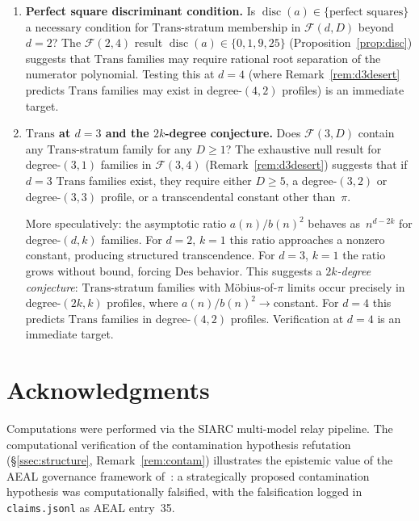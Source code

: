 \documentclass[12pt, reqno]{amsart}
\theoremstyle{definition}
\theoremstyle{remark}
\newcommand{\Trans}{\mathrm{Trans}}
\newcommand{\Des}{\mathrm{Des}}
\DeclareMathOperator{\disc}{disc}
\begin{document}
\begin{enumerate}[\bfseries(P1)]
\item \textbf{Perfect square discriminant condition.}
Is $\disc(a) \in \{\text{perfect squares}\}$
a necessary condition for $\Trans$-stratum membership in $\mathcal{F}(d,D)$ beyond $d=2$?
The $\mathcal{F}(2,4)$ result $\disc(a) \in \{0, 1, 9, 25\}$ (Proposition~\ref{prop:disc}) suggests that
$\Trans$ families may require rational root separation of the numerator polynomial.
Testing this at $d=4$ (where Remark~\ref{rem:d3desert} predicts $\Trans$ families may exist in
degree-$(4,2)$ profiles) is an immediate target.

\item \textbf{$\Trans$ at $d=3$ and the $2k$-degree conjecture.}
Does $\mathcal{F}(3,D)$ contain any $\Trans$-stratum family for any
$D \ge 1$? The exhaustive null result for degree-$(3,1)$
families in $\mathcal{F}(3,4)$ (Remark~\ref{rem:d3desert}) suggests that if $d=3$
$\Trans$ families exist, they require either $D \ge 5$,
a degree-$(3,2)$ or degree-$(3,3)$ profile, or a
transcendental constant other than~$\pi$.

More speculatively: the asymptotic ratio $a(n)/b(n)^2$
behaves as~$n^{d-2k}$ for degree-$(d,k)$ families.
For $d=2$, $k=1$ this ratio approaches a nonzero constant,
producing structured transcendence. For $d=3$, $k=1$
the ratio grows without bound, forcing $\Des$ behavior.
This suggests a \emph{$2k$-degree conjecture}: $\Trans$-stratum
families with M\"obius-of-$\pi$ limits occur precisely in
degree-$(2k,k)$ profiles, where $a(n)/b(n)^2 \to {}$constant.
For $d=4$ this predicts $\Trans$ families in degree-$(4,2)$
profiles. Verification at $d=4$ is an immediate target.
\end{enumerate}


\section*{Acknowledgments}

Computations were performed via the SIARC multi-model relay pipeline.
The computational verification of the contamination hypothesis refutation
(\S\ref{ssec:structure}, Remark~\ref{rem:contam}) illustrates the epistemic value of the AEAL governance
framework of~\cite{aeal}: a strategically proposed contamination hypothesis
was computationally falsified, with the falsification logged in \texttt{claims.jsonl}
as AEAL entry~35.
\end{document}

